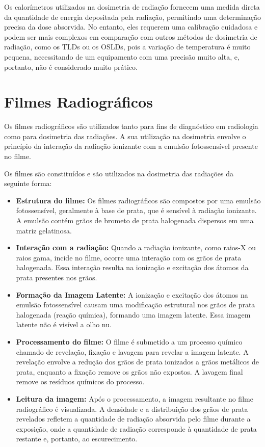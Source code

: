 \documentclass[11pt,a4paper]{article}
\begin{document}
		Os calorímetros utilizados na dosimetria de radiação fornecem uma medida direta da quantidade de energia depositada pela radiação, permitindo uma determinação precisa da dose absorvida. No entanto, eles requerem uma calibração cuidadosa e podem ser mais complexos em comparação com outros métodos de dosimetria de radiação, como os TLDs ou os OSLDs, pois a variação de temperatura é muito pequena, necessitando de um equipamento com uma precisão muito alta, e, portanto, não é considerado muito prático.

	\section{Filmes Radiográficos}

		Os filmes radiográficos são utilizados tanto para fins de diagnóstico em radiologia como para dosimetria das radiações. A sua utilização na dosimetria envolve o princípio da interação da radiação ionizante com a emulsão fotossensível presente no filme.

		Os filmes são constituídos e são utilizados na dosimetria das radiações da seguinte forma:

		\begin{itemize}
			\item \textbf{Estrutura do filme:} Os filmes radiográficos são compostos por uma emulsão fotossensível, geralmente à base de prata, que é sensível à radiação ionizante. A emulsão contém grãos de brometo de prata halogenada dispersos em uma matriz gelatinosa.
			\item \textbf{Interação com a radiação:} Quando a radiação ionizante, como raios-X ou raios gama, incide no filme, ocorre uma interação com os grãos de prata halogenada. Essa interação resulta na ionização e excitação dos átomos da prata presentes nos grãos.
			\item \textbf{Formação da Imagem Latente:} A ionização e excitação dos átomos na emulsão fotossensível causam uma modificação estrutural nos grãos de prata halogenada (reação química), formando uma imagem latente. Essa imagem latente não é visível a olho nu.
			\item \textbf{Processamento do filme:} O filme é submetido a um processo químico chamado de revelação, fixação e lavagem para revelar a imagem latente. A revelação envolve a redução dos grãos de prata ionizados a grãos metálicos de prata, enquanto a fixação remove os grãos não expostos. A lavagem final remove os resíduos químicos do processo.
			\item \textbf{Leitura da imagem:} Após o processamento, a imagem resultante no filme radiográfico é visualizada. A densidade e a distribuição dos grãos de prata revelados refletem a quantidade de radiação absorvida pelo filme durante a exposição, onde a quantidade de radiação corresponde à quantidade de prata restante e, portanto, ao escurecimento.
		\end{itemize}
\end{document}
